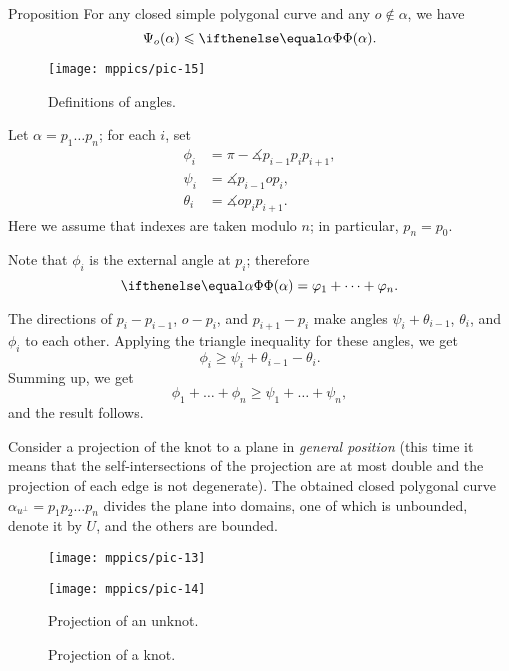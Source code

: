 \begin{thm}{Proposition}\label{prop:angular-length}
For any closed simple polygonal curve and any $o\notin\alpha$, we have 
\[\Psi_o(\alpha)\le \tc{\alpha}.\]
\end{thm}

\begin{wrapfigure}{r}{45 mm}
\vskip-7mm
\centering
\texttt{[image: mppics/pic-15]}
\caption*{Definitions of angles.}
\vskip0mm
\end{wrapfigure}

Let $\alpha=p_1\dots p_n$; for each $i$, set 
\begin{align*}
\phi_i&=\pi-\measuredangle p_{i-1}p_ip_{i+1},
\\
\psi_i&=\measuredangle p_{i-1} o p_{i},
\\
\theta_i&=\measuredangle o p_i p_{i+1}.
\end{align*}
Here we assume that indexes are taken modulo $n$; in particular, $p_{n}=p_0$.

Note that $\phi_i$ is the external angle at $p_i$;
therefore 
\[\tc\alpha= \phi_1+\dots+\phi_n.\]

The directions of $p_i-p_{i-1}$, $o-p_i$, and $p_{i+1}-p_i$ make angles 
$\psi_i+\theta_{i-1}$, $\theta_i$, and $\phi_i$ to each other.
Applying the triangle inequality for these angles, we get
\[\phi_i\ge \psi_i+\theta_{i-1}-\theta_i.\]
Summing up, we get
\[\phi_1+\dots+\phi_n\ge \psi_1+\dots+\psi_n,\]
and the result follows.
\qeds

Consider a projection of the knot to a plane in \emph{general position}
(this time it means that the self-intersections of the projection are at most double and the projection of each edge is not degenerate).
The obtained closed polygonal curve $\alpha_{u^\perp}=p_1p_2\dots p_n$ divides the plane into domains, one of which is unbounded, denote it by $U$, and the others are bounded.

\begin{figure}[!ht]
\begin{minipage}{.48\textwidth}
\centering
\texttt{[image: mppics/pic-13]}
\end{minipage}\hfill
\begin{minipage}{.48\textwidth}
\centering
\texttt{[image: mppics/pic-14]}
\end{minipage}

\medskip

\begin{minipage}{.48\textwidth}
\centering
\caption*{Projection of an unknot.}
\end{minipage}\hfill
\begin{minipage}{.48\textwidth}
\centering
\caption*{Projection of a knot.}
\end{minipage}
\vskip-4mm
\end{figure}

